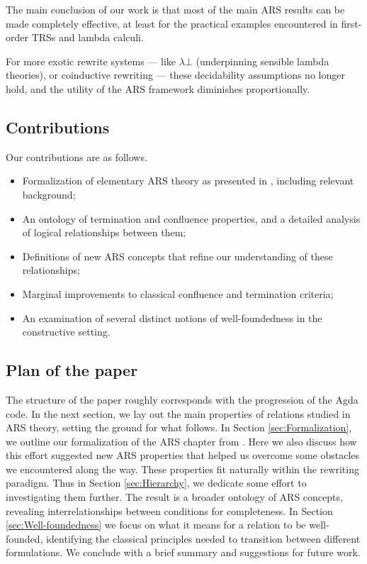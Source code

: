 The main conclusion of our work is that most of the main ARS results can be made completely effective, at least for the practical examples encountered in first-order TRSs and lambda calculi.

For more exotic rewrite systems --- like $\lambda \bot$ (underpinning sensible lambda theories), or coinductive rewriting ---
these decidability assumptions no longer hold, and the utility of the ARS framework diminishes proportionally.

\subsection{Contributions}
Our contributions are as follows.
\begin{itemize}
  \item Formalization of elementary ARS theory as presented in
  \cite{Terese}, including relevant background;
  \item An ontology of termination and confluence properties, and a detailed analysis of logical relationships between them;
  \item Definitions of new ARS concepts that refine our understanding of these relationships;
  \item Marginal improvements to classical confluence and termination criteria;
  \item An examination of several distinct notions of well-foundedness
  in the constructive setting.
\end{itemize}

\subsection{Plan of the paper}

The structure of the paper roughly corresponds with the progression of the Agda code.
In the next section, we lay out the main properties of relations studied in ARS theory,
setting the ground for what follows.  In Section \ref{sec:Formalization}, we
outline our formalization of the ARS chapter from \cite{Terese}.
Here we also discuss how this effort suggested new ARS properties that helped us overcome some obstacles we encountered along the way.  These properties fit naturally within the rewriting paradigm.  Thus in Section \ref{sec:Hierarchy}, we dedicate some effort to investigating them further.  The result is a broader ontology of ARS concepts, revealing interrelationships between conditions for completeness.  In Section \ref{sec:Well-foundedness} we focus on what it means for a relation to be well-founded, identifying the classical principles needed to transition between different formulations.
We conclude with a brief summary and suggestions for future work.

